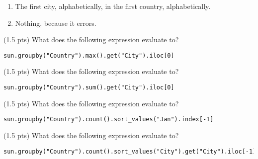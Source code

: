 \begin{prob}[(17 pts)]
\begin{enumerate}[label=\Alph*.]
    \item The first city, alphabetically, in the first country, alphabetically.
    
    \item Nothing, because it errors.
\end{enumerate}

\begin{subprobset}

\begin{subprob}(1.5 pts) What does the following expression evaluate to?

\begin{verbatim}
sun.groupby("Country").max().get("City").iloc[0]
\end{verbatim}


\end{subprob}

\begin{subprob}(1.5 pts) What does the following expression evaluate to?

\begin{verbatim}
sun.groupby("Country").sum().get("City").iloc[0]
\end{verbatim}


\end{subprob}

\begin{subprob}(1.5 pts) What does the following expression evaluate to?
\begin{verbatim}
sun.groupby("Country").count().sort_values("Jan").index[-1]
\end{verbatim}


\end{subprob}

\begin{subprob}(1.5 pts) What does the following expression evaluate to?
\begin{verbatim}
sun.groupby("Country").count().sort_values("City").get("City").iloc[-1]
\end{verbatim}


\end{subprob}
   
\end{subprobset}

\end{prob}


